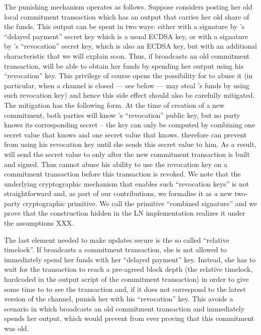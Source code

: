    The punishing mechanism operates as follows. Suppose \alice{}
    considers posting her
    old local commitment transaction which  has an output that carries her old share of the funds. This output can be spent in two ways: either with a signature by \alice's ``delayed payment'' secret key which is a usual ECDSA key, or with a
    signature by \bob's ``revocation'' secret key, which is also an ECDSA key,
    but with an additional characteristic that we will explain soon. Thus, if \alice{}
    broadcasts an old commitment transaction, \bob{} will be able to obtain her
    funds by spending her output using his ``revocation'' key. This privilege 
    of course 
    opens the possibility for \bob{} to abuse it
    (in particular, when a channel is closed --- see below --- \bob{} may steal
    \alice's funds by using such revocation key)
    and hence this side effect 
    should also 
    be carefully mitigated. The mitigation has the following form. At the time of
    creation of a new commitment, both parties will know \bob's ``revocation'' public
    key, but no party knows its corresponding secret -- the key
    can only be computed by
    combining one secret value that \alice{} knows and one secret value 
    that \bob{} knows.
    \alice{} therefore can prevent \bob{} from using his revocation key until
    she  sends  this secret value to him. 
    As a result, \alice{} will send the secret value to \bob{} only after the new commitment transaction is built and signed.
    Thus \bob{} cannot abuse his ability to use the revocation key on a
    commitment transaction before this transaction is revoked. 
    We note that the underlying cryptographic mechanism  
    that enables such ``revocation keys''  is not straightforward 
    and, as part of our contributions, we formalise it as a new two-party 
    cryptographic primitive. We call the primitive ``combined signature'' and we 
    prove that the construction hidden in the LN implementation realizes it under
    the assumptions XXX.

    The last element needed to make updates secure is the so called ``relative
    timelock''. If \alice{} broadcasts a commitment transaction, she is not
    allowed to immediately spend her funds with her ``delayed payment'' key.
    Instead, she has to wait for the transaction to reach a pre-agreed block
    depth (the relative timelock, hardcoded in the output script of the
    commitment transaction) in order to give some time to \bob{} to see the
    transaction and, if it does not correspond to the latest version of the
    channel, punish her with his ``revocation'' key. This avoids a scenario in
    which \alice{} broadcasts an old commitment transaction and immediately
    spends her output, which would prevent \bob{} from ever proving that this
    commitment was old.

